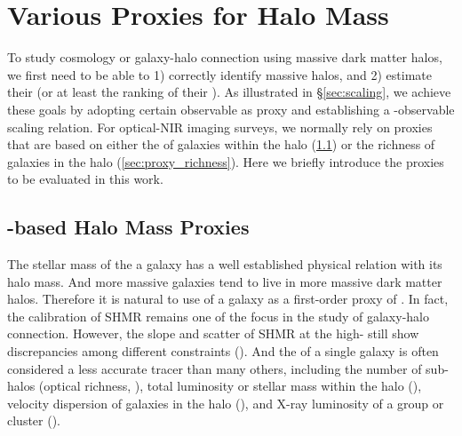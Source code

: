 \documentclass[a4paper,fleqn,usenatbib]{mnras}
\begin{document}

\section{Various Proxies for Halo Mass}
    \label{sec:proxies}

    To study cosmology or galaxy-halo connection using massive dark matter halos, we first 
    need to be able to 1) correctly identify massive halos, and 2) estimate their \mvir{}
    (or at least the ranking of their \mvir{}).
    As illustrated in \S \ref{sec:scaling}, we achieve these goals by adopting certain observable 
    as \mvir{} proxy and establishing a \mvir{}-observable scaling relation.
    For optical-NIR imaging surveys, we normally rely on \mvir{} proxies that are based on
    either the \mstar{} of galaxies within the halo (\ref{sec:proxy_mstar}) or the richness of 
    galaxies in the halo (\ref{sec:proxy_richness}).
    Here we briefly introduce the \mvir{} proxies to be evaluated in this work. 

\subsection{\mstar{}-based Halo Mass Proxies}
    \label{sec:proxy_mstar}

    The stellar mass of the a galaxy has a well established physical relation with its halo mass.
    And more massive galaxies tend to live in more massive dark matter halos.
    Therefore it is natural to use \mstar{} of a galaxy as a first-order proxy of \mvir{}.
    In fact, the calibration of SHMR remains one of the focus in the study of galaxy-halo connection.
    However, the slope and scatter of SHMR at the high-\mstar{} still show discrepancies among
    different constraints (\addref{}).
    And the \mstar{} of a single galaxy is often considered a less accurate \mvir{} tracer
    than many others, including the number of sub-halos (optical richness, \addref{}),
    total luminosity or stellar mass within the halo (\addref{}), velocity dispersion of galaxies
    in the halo (\addref{}), and X-ray luminosity of a group or cluster (\addref{}).
\end{document}
